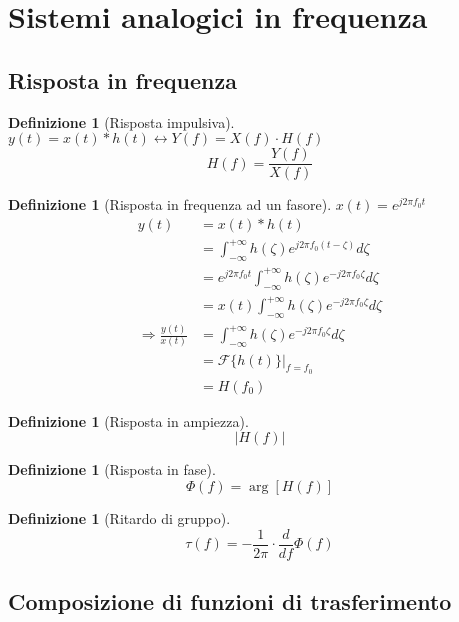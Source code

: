 \documentclass[a4paper,10pt]{article}
\theoremstyle{mystyle}
\newtheorem{definition}[theorem]{Definizione}
\begin{document}
\newpage

\section{Sistemi analogici in frequenza}
\subsection{Risposta in frequenza}
\begin{definition}[Risposta impulsiva]
    \(y(t) = x(t)*h(t) \leftrightarrow Y(f) = X(f) \cdot H(f)\)
    \[
        H(f)  = \frac{Y(f)}{X(f)}
    \]
\end{definition}

\begin{definition}[Risposta in frequenza ad un fasore]
    \(x(t) = e^{j2 \pi f_0 t}\)
    \[
        \begin{aligned}
            y(t)
            &= x(t) *h(t)   \\
            &= \int_{-\infty}^{+\infty} h(\zeta) e^{j 2 \pi f_0 (t-\zeta)} d \zeta \\
            &= e^{j2 \pi f_0 t} \int_{-\infty}^{+\infty} h(\zeta) e^{-j2 \pi f_0 \zeta} d\zeta \\
            &= x(t) \int_{-\infty}^{+\infty} h(\zeta) e^{-j 2 \pi f_0 \zeta} d\zeta \\
            \Rightarrow \frac{y(t)}{x(t)}
            &= \int_{-\infty}^{+\infty} h(\zeta) e^{-j 2 \pi f_0 \zeta} d \zeta \\
            &= \mathcal{F}\{h(t)\} \rvert_{f=f_0}   \\
            &= H(f_0)
        \end{aligned}
    \]
\end{definition}

\begin{definition}[Risposta in ampiezza]
    \[
        \lvert H(f) \rvert
    \]
\end{definition}

\begin{definition}[Risposta in fase]
    \[
        \Phi (f) = \arg [H(f)]
    \]
\end{definition}

\begin{definition}[Ritardo di gruppo]
    \[
        \tau(f) = - \frac{1}{2 \pi} \cdot  \frac{d}{df} \Phi(f)
    \]
\end{definition}

\subsection{Composizione di funzioni di trasferimento}
\end{document}
